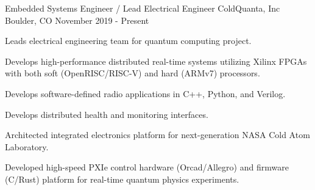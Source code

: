 

\begin{cventries}


  \cventry
    {Embedded Systems Engineer / Lead Electrical Engineer} %
    {ColdQuanta, Inc} %
    {Boulder, CO} %
    {November 2019 - Present} %
    {
      \begin{cvitems} %
		\item {
			Leads electrical engineering team for quantum computing project.
		}
        \item {
			Develops high-performance distributed real-time systems utilizing \textrm{Xilinx} FPGAs with both soft (\textrm{OpenRISC}/\textrm{RISC-V}) and hard (\textrm{ARMv7}) processors.
        }
		\item {
			Develops software-defined radio applications in \textrm{C++}, \textrm{Python}, and \textrm{Verilog}.
		}
        \item {
			Develops distributed health and monitoring interfaces.
        }
		\item {
			Architected integrated electronics platform for next-generation NASA Cold Atom Laboratory.
		}
		\item {
				Developed high-speed PXIe control hardware (\textrm{Orcad/Allegro}) and firmware (\textrm{C}/\textrm{Rust}) platform for real-time quantum physics experiments.
		}
      \end{cvitems}
    }



\end{cventries}
